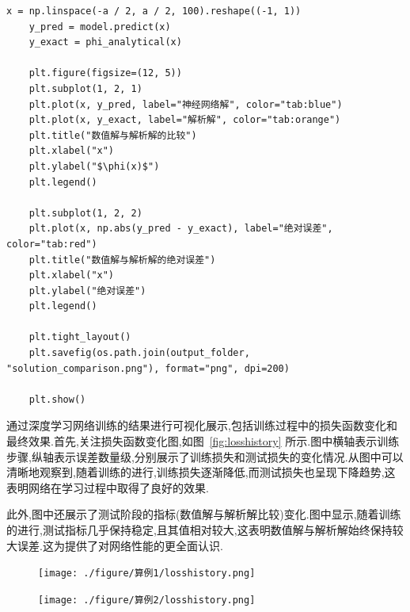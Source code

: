 \documentclass{Sichuan Normal University}
\begin{document}
\begin{lstlisting}[style=python,basicstyle=\footnotesize\fontspec{Courier New},]
    x = np.linspace(-a / 2, a / 2, 100).reshape((-1, 1))
    y_pred = model.predict(x)
    y_exact = phi_analytical(x)
    
    plt.figure(figsize=(12, 5))
    plt.subplot(1, 2, 1)
    plt.plot(x, y_pred, label="神经网络解", color="tab:blue")
    plt.plot(x, y_exact, label="解析解", color="tab:orange")
    plt.title("数值解与解析解的比较")
    plt.xlabel("x")
    plt.ylabel("$\phi(x)$")
    plt.legend()
    
    plt.subplot(1, 2, 2)
    plt.plot(x, np.abs(y_pred - y_exact), label="绝对误差", color="tab:red")
    plt.title("数值解与解析解的绝对误差")
    plt.xlabel("x")
    plt.ylabel("绝对误差")
    plt.legend()
    
    plt.tight_layout()
    plt.savefig(os.path.join(output_folder, "solution_comparison.png"), format="png", dpi=200)
    
    plt.show()
\end{lstlisting}
通过深度学习网络训练的结果进行可视化展示,包括训练过程中的损失函数变化和最终效果.首先,关注损失函数变化图,如图~\ref{fig:losshistory} 所示.图中横轴表示训练步骤,纵轴表示误差数量级,分别展示了训练损失和测试损失的变化情况.从图中可以清晰地观察到,随着训练的进行,训练损失逐渐降低,而测试损失也呈现下降趋势,这表明网络在学习过程中取得了良好的效果.

此外,图中还展示了测试阶段的指标(数值解与解析解比较)变化.图中显示,随着训练的进行,测试指标几乎保持稳定,且其值相对较大,这表明数值解与解析解始终保持较大误差.这为提供了对网络性能的更全面认识.

\begin{figure}[H]
    \centering
    \begin{minipage}[c]{0.48\textwidth}
    \centering
    \texttt{[image: ./figure/算例1/losshistory.png]}
    \end{minipage}
    \hspace{0.02\textwidth}
    \begin{minipage}[c]{0.48\textwidth}
    \centering
    \texttt{[image: ./figure/算例2/losshistory.png]}
    \end{minipage}\\[3mm]
    \begin{minipage}[t]{0.48\textwidth}
    \centering
    \label{fig:losshistory}
    \end{minipage}
    \hspace{0.02\textwidth}
    \begin{minipage}[t]{0.48\textwidth}
    \centering
    \label{fig:losshistory2}
    \end{minipage}
    \end{figure}
\end{document}
